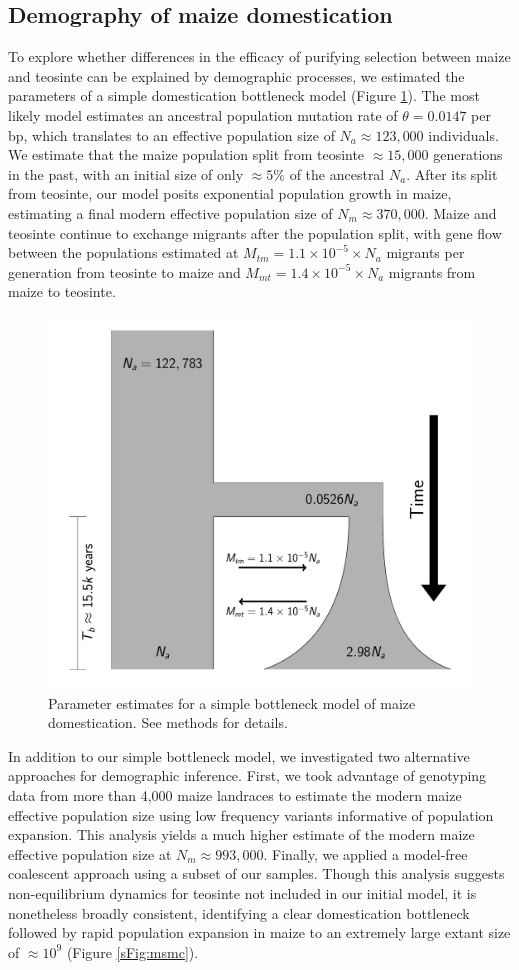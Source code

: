 \documentclass{pnastwo}
\begin{document}
\begin{article}
\subsection{Demography of maize domestication} %
To explore whether differences in the efficacy of purifying selection between maize and teosinte can be explained by demographic processes, we estimated the parameters of a simple domestication bottleneck model  (Figure \ref{fig:bottleneck}). 
The most likely model estimates an ancestral population mutation rate of $\theta=0.0147$ per bp, which translates to an effective population size of $N_a \approx 123,000$ individuals.
We estimate that the maize population split from teosinte $\approx 15,000$ generations in the past, with an initial size of only $\approx 5\% $ of the ancestral $N_a$. 
After its split from teosinte, our model posits exponential population growth in maize, estimating a final modern effective population size of $N_m \approx 370,000$.
Maize and teosinte continue to exchange migrants after the population split, with gene flow between the populations estimated at $M_{tm} =  1.1 \times 10^{-5} \times N_a $  migrants per generation from teosinte to maize and $M_{mt} =  1.4 \times 10^{-5} \times N_a$ migrants from maize to teosinte. 

\begin{figure}
\centering
\includegraphics[width=.4\textwidth]{FigsAndFiles/DomesticationModel/domesticationModel.pdf}
\caption{Parameter estimates for a simple bottleneck model of maize domestication. See methods for details. \label{fig:bottleneck} }
\end{figure}

In addition to our simple bottleneck model, we investigated two alternative approaches for demographic inference.  First, we took advantage of genotyping data from more than 4,000 maize landraces \cite{Hearne2015} to estimate the modern maize effective population size using low frequency variants  informative of population expansion. 
This analysis yields a much higher estimate of the modern maize effective population size at  $N_m \approx 993,000$.
Finally, we applied a model-free coalescent approach \cite{schiffels2014} using a subset of our samples. 
Though this analysis suggests non-equilibrium dynamics for teosinte not included in our initial model, it is nonetheless broadly consistent, identifying a clear domestication bottleneck followed by rapid population expansion in maize to an extremely large extant size of $\approx 10^9$ (Figure \ref{sFig:msmc}). 


\end{article}
\end{document}
